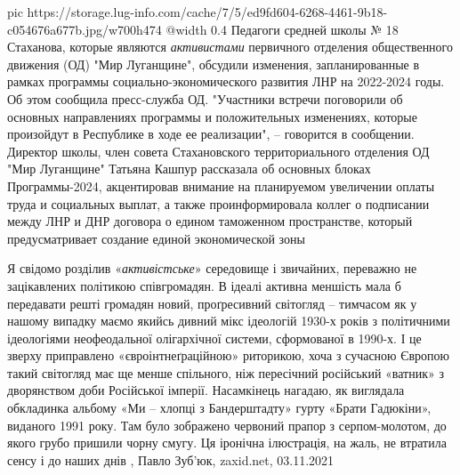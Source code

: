 \ifcmt
  pic https://storage.lug-info.com/cache/7/5/ed9fd604-6268-4461-9b18-c054676a677b.jpg/w700h474
  @width 0.4
\fi
Педагоги средней школы № 18 Стаханова, которые являются \emph{активистами} первичного
отделения общественного движения (ОД) "Мир Луганщине", обсудили изменения,
запланированные в рамках программы социально-экономического развития ЛНР на
2022-2024 годы. Об этом сообщила пресс-служба ОД.  "Участники встречи
поговорили об основных направлениях программы и положительных изменениях,
которые произойдут в Республике в ходе ее реализации", – говорится в сообщении.
Директор школы, член совета Стахановского территориального отделения ОД "Мир
Луганщине" Татьяна Кашпур рассказала об основных блоках Программы-2024,
акцентировав внимание на планируемом увеличении оплаты труда и социальных
выплат, а также проинформировала коллег о подписании между ЛНР и ДНР договора о
едином таможенном пространстве, который предусматривает создание единой
экономической зоны
  

Я свідомо розділив «\emph{активістське}» середовище і звичайних, переважно не
зацікавлених політикою співгромадян. В ідеалі активна меншість мала б
передавати решті громадян новий, проґресивний світогляд – тимчасом як у нашому
випадку маємо якийсь дивний мікс ідеологій 1930-х років з політичними
ідеологіями неофеодальної олігархічної системи, сформованої в 1990-х. І це
зверху приправлено «євроінтнеґраційною» риторикою, хоча з сучасною Європою
такий світогляд має ще менше спільного, ніж пересічний російський «ватник» з
дворянством доби Російської імперії.  Насамкінець нагадаю, як виглядала
обкладинка альбому «Ми – хлопці з Бандерштадту» гурту «Брати Гадюкіни»,
виданого 1991 року. Там було зображено червоний прапор з серпом-молотом, до
якого грубо пришили чорну смугу. Ця іронічна ілюстрація, на жаль, не втратила
сенсу і до наших днів
, Павло Зуб'юк, zaxid.net, 03.11.2021



